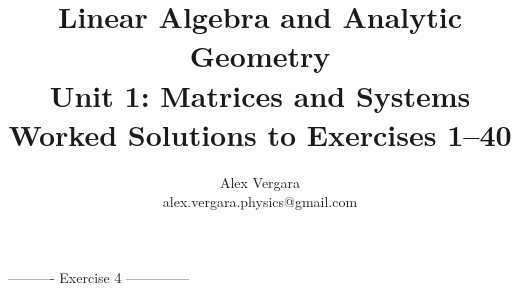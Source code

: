 \documentclass[12pt,twoside,a4paper]{article}
\title{
  \textbf{Linear Algebra and Analytic Geometry}\\[0.35em]
  \large Unit 1: Matrices and Systems\\[0.2em]
  \normalsize Worked Solutions to Exercises 1--40
}
\author{Alex Vergara\\alex.vergara.physics@gmail.com}
\date{}
\begin{document}
\maketitle

\begin{enumerate}

  
  
  
  
  ---------- Exercise 4 --------------
  
  
  
  
  
  
  
  
  
  
  
  
  
  
  
  
  
  
  
  
  
  
  
  
  
  
  
  
  
  
  
  
  
  




\end{enumerate}
\end{document}
